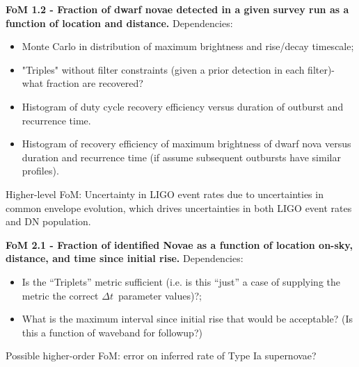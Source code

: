 {\bf FoM 1.2 - Fraction of dwarf novae detected in a given survey
  run as a function of location and distance.}
Dependencies:
\begin{itemize}
  \item Monte Carlo in distribution of maximum brightness and rise/decay timescale;
    \item "Triples" without filter constraints (given a prior detection in each filter)- what fraction are recovered?
    \item Histogram of duty cycle recovery efficiency versus duration of outburst and recurrence time.
    \item Histogram of recovery efficiency of maximum brightness of dwarf nova versus duration and recurrence time (if assume subsequent outbursts have similar profiles).
    \end{itemize}
Higher-level FoM: Uncertainty in LIGO event rates due to
uncertainties in common envelope evolution, which drives uncertainties in both LIGO event rates and DN population.

{\bf FoM 2.1 - Fraction of identified Novae as a function of location on-sky, distance, and time since initial rise.}
Dependencies:
\begin{itemize}
  \item Is the ``Triplets'' metric sufficient (i.e. is this ``just'' a case of supplying the metric the correct $\Delta t$~parameter values)?;
    \item What is the maximum interval since initial rise that would be acceptable? (Is this a function of waveband for followup?)
\end{itemize}
Possible higher-order FoM: error on inferred rate of Type Ia supernovae?



